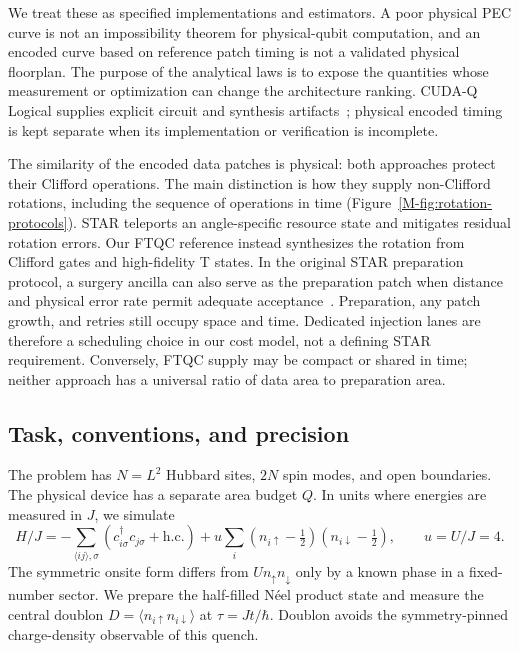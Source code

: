 \documentclass[11pt]{article}
\begin{document}
We treat these as specified implementations and estimators. A poor physical
PEC curve is not an impossibility theorem for physical-qubit computation, and an encoded curve based
on reference patch timing is not a validated physical floorplan. The purpose
of the analytical laws is to expose the quantities whose measurement or
optimization can change the architecture ranking. CUDA-Q Logical supplies
explicit circuit and synthesis artifacts~\cite{cudaqlogical}; physical encoded
timing is kept separate when its implementation or verification is incomplete.


The similarity of the encoded data patches is physical: both approaches
protect their Clifford operations. The main distinction is how they supply
non-Clifford rotations, including the sequence of operations in time
(Figure~\ref{M-fig:rotation-protocols}). STAR teleports an angle-specific
resource state and mitigates residual rotation errors. Our FTQC reference
instead synthesizes the rotation from Clifford gates and high-fidelity T
states. In the original STAR preparation protocol, a surgery ancilla can
also serve as the preparation patch when distance and physical error rate
permit adequate acceptance~\cite[Sec.~II A 2]{toshio}. Preparation, any patch
growth, and retries still occupy space and time. Dedicated injection lanes
are therefore a scheduling choice in our cost model, not a defining STAR
requirement. Conversely, FTQC supply may be compact or shared in time;
neither approach has a universal ratio of data area to preparation area.

\subsection{Task, conventions, and precision}
The problem has $N=L^2$ Hubbard sites, $2N$ spin modes, and open boundaries.
The physical device has a separate area budget $Q$. In units where energies
are measured in $J$, we simulate
\begin{equation}\label{eq:H-v0}
 H/J=-\sum_{\langle ij\rangle,\sigma}
 (c^\dagger_{i\sigma}c_{j\sigma}+\mathrm{h.c.})
 +u\sum_i(n_{i\uparrow}-\tfrac12)(n_{i\downarrow}-\tfrac12),
 \qquad u=U/J=4.
\end{equation}
The symmetric onsite form differs from $U n_\uparrow n_\downarrow$ only
by a known phase in a fixed-number sector. We prepare the half-filled
N\'eel product state and measure the central doublon
$D=\langle n_{i\uparrow}n_{i\downarrow}\rangle$ at $\tau=Jt/\hbar$.
Doublon avoids the symmetry-pinned charge-density observable of this quench.
\end{document}
